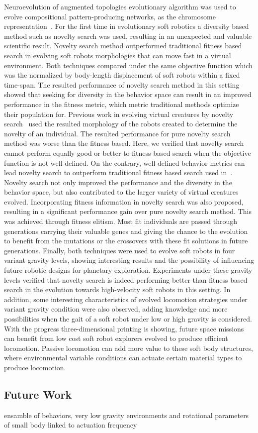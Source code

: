 \documentclass{sig-alternate}
\begin{document}
Neuroevolution of augmented topologies evolutionary algorithm was used to evolve compositional pattern-producing networks, as the chromosome representation~\cite{cheney2013unshackling}. For the first time in evolutionary soft robotics a diversity based method such as novelty search was used, resulting in an unexpected and valuable scientific result. Novelty search method outperformed traditional fitness based search in evolving soft robots morphologies that can move fast in a virtual environment. Both techniques compared under the same objective function which was the normalized by body-length displacement of soft robots within a fixed time-span. The resulted performance of novelty search method in this setting showed that seeking for diversity in the behavior space can result in an improved performance in the fitness metric, which metric traditional methods optimize their population for. Previous work in evolving virtual creatures by novelty search~\cite{lehman2011evolving} used the resulted morphology of the robots created to determine the novelty of an individual. The resulted performance for pure novelty search method was worse than the fitness based. Here, we verified that novelty search cannot perform equally good or better to fitness based search when the objective function is not well defined. On the contrary, well defined behavior metrics can lead novelty search to outperform traditional fitness based search used in~\cite{cheney2013unshackling}. Novelty search not only improved the performance and the diversity in the behavior space, but also contributed to the larger variety of virtual creatures evolved. Incorporating fitness information in novelty search was also proposed, resulting in a significant performance gain over pure novelty search method. This was achieved through fitness elitism. Most fit individuals are passed through generations carrying their valuable genes and giving the chance to the evolution to benefit from the mutations or the crossovers with these fit solutions in future generations. Finally, both techniques were used to evolve soft robots in four variant gravity levels, showing interesting results and the possibility of influencing future robotic designs for planetary exploration. Experiments under these gravity levels verified that novelty search is indeed performing better than fitness based search in the evolution towards high-velocity soft robots in this setting. In addition, some interesting characteristics of evolved locomotion strategies under variant gravity condition were also observed, adding knowledge and more possibilities when the gait of a soft robot under low or high gravity is considered. With the progress three-dimensional printing is showing, future space missions can benefit from low cost soft robot explorers evolved to produce efficient locomotion. Passive locomotion can add more value to these soft body structures, where environmental variable conditions can actuate certain material types to produce locomotion.

\subsection{Future Work}
ensamble of behaviors, very low gravity environments and rotational parameters of small body linked to actuation frequency


\begingroup
{}


\endgroup
\end{document}
